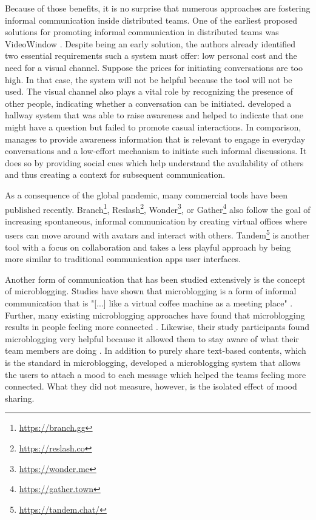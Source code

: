 Because of those benefits, it is no surprise that numerous approaches are fostering informal communication inside distributed teams. One of the earliest proposed solutions for promoting informal communication in distributed teams was VideoWindow \autocite{fish1990videowindow}. Despite being an early solution, the authors already identified two essential requirements such a system must offer: low personal cost and the need for a visual channel. Suppose the prices for initiating conversations are too high. In that case, the system will not be helpful because the tool will not be used. The visual channel also plays a vital role by recognizing the presence of other people, indicating whether a conversation can be initiated. \textcite{sasaki1999video} developed a hallway system that was able to raise awareness and helped to indicate that one might have a question but failed to promote casual interactions. In comparison, \textcite{lou2012presencescape} manages to provide awareness information that is relevant to engage in everyday conversations and a low-effort mechanism to initiate such informal discussions. It does so by providing social cues which help understand the availability of others and thus creating a context for subsequent communication.

As a consequence of the global pandemic, many commercial tools have been published recently. Branch\footnote{\url{https://branch.gg}}, Reslash\footnote{\url{https://reslash.co}}, Wonder\footnote{\url{https://wonder.me}}, or Gather\footnote{\url{https://gather.town}} also follow the goal of increasing spontaneous, informal communication by creating virtual offices where users can move around with avatars and interact with others. Tandem\footnote{\url{https://tandem.chat/}} is another tool with a focus on collaboration and takes a less playful approach by being more similar to traditional communication apps user interfaces.

Another form of communication that has been studied extensively is the concept of microblogging. Studies have shown that microblogging is a form of informal communication \autocite{ehrlich2010microblogging} that is "[...] like a virtual coffee machine as a meeting place" \autocite{ebner2008microblogging}. Further, many existing microblogging approaches have found that microblogging results in people feeling more connected \autocite{ehrlich2010microblogging, zhang2010case}. Likewise, their study participants found microblogging very helpful because it allowed them to stay aware of what their team members are doing \autocite{zhang2010case}. In addition to purely share text-based contents, which is the standard in microblogging, \textcite{dullemond2013fixing} developed a microblogging system that allows the users to attach a mood to each message which helped the teams feeling more connected. What they did not measure, however, is the isolated effect of mood sharing.

